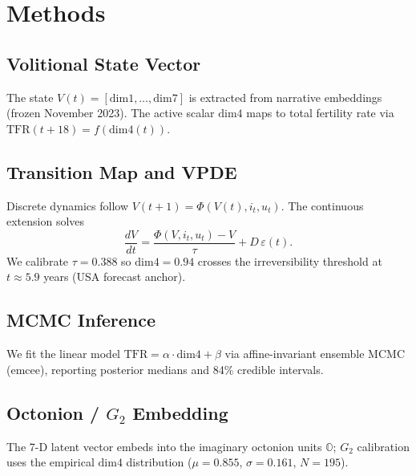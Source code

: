 \section{Methods}
\label{sec:methods}

\subsection{Volitional State Vector}
The state $V(t) = [\mathrm{dim1},\ldots,\mathrm{dim7}]$ is extracted from
narrative embeddings (frozen November 2023). The active scalar $\mathrm{dim4}$
maps to total fertility rate via $ \mathrm{TFR}(t{+}18) = f(\mathrm{dim4}(t))$.

\subsection{Transition Map and VPDE}
Discrete dynamics follow $V(t{+}1) = \Phi(V(t), i_t, u_t)$. The continuous
extension solves
\[
  \frac{dV}{dt} = \frac{\Phi(V, i_t, u_t) - V}{\tau} + D\,\varepsilon(t).
\]
We calibrate $\tau = 0.388$ so $\mathrm{dim4} = 0.94$ crosses the
irreversibility threshold at $t \approx 5.9$ years
(USA forecast anchor).

\subsection{MCMC Inference}
We fit the linear model $\mathrm{TFR} = \alpha\cdot\mathrm{dim4} + \beta$
via affine-invariant ensemble MCMC (emcee), reporting posterior medians and
84\% credible intervals.

\subsection{Octonion / $G_2$ Embedding}
The 7-D latent vector embeds into the imaginary octonion units $\mathbb{O}$;
$G_2$ calibration uses the empirical $\mathrm{dim4}$ distribution
($\mu = 0.855$, $\sigma = 0.161$, $N = 195$).
